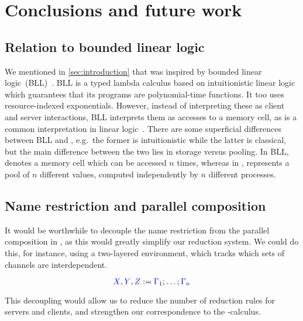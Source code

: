 \chapter{Conclusions and future work}\label{sec:discussion}


\section{Relation to bounded linear logic}
We mentioned in \cref{sec:introduction} that \nodcap was inspired by
bounded linear logic~(BLL)~\cite{girard1992}. BLL is a typed lambda calculus
based on intuitionistic linear logic which guarantees that its programs are
polynomial-time functions.
It too uses resource-indexed exponentials. However, instead of interpreting
these as client and server interactions, BLL interprets them as accesses to a
memory cell, as is a common interpretation in linear logic~\cite{girard1987}.
There are some superficial differences between BLL and \nodcap, e.g.\ the former
is intuitionistic while the latter is classical, but the main difference between
the two lies in storage versus pooling. In BLL,  denotes a memory
cell which can be accessed $n$ times, whereas in \nodcap, 
represents a pool of $n$ different values, computed independently by $n$
different processes.

\section{Name restriction and parallel composition}
It would be worthwhile to decouple the name restriction from the parallel
composition in \cp, as this would greatly simplify our reduction system.
We could do this, for instance, using a two-layered environment, which tracks
which sets of channels are interdependent.
\begin{center}
  \[
    \textcolor{blue}{X}, \textcolor{blue}{Y}, \textcolor{blue}{Z} := \textcolor{blue}{\Gamma_1} ; \dots ; \textcolor{blue}{\Gamma_n}
  \]
  \vspace*{1\baselineskip}
  \begin{prooftree*}
  \end{prooftree*}
  \begin{prooftree*}
  \end{prooftree*}
\end{center}
This decoupling would allow us to reduce the number of reduction rules for
servers and clients, and strengthen our correspondence to the \textpi-calculus.

